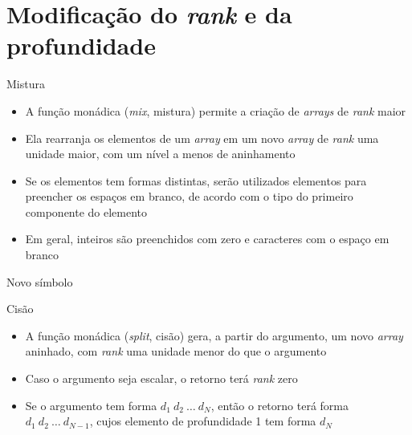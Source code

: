 \section{Modificação do {\it rank} e da profundidade}

\begin{frame}[fragile]{Mistura}

    \begin{itemize}
        \item A função monádica  (\textit{mix}, mistura) permite a criação de 
            \textit{arrays} de \textit{rank} maior
        \pause

        \item Ela rearranja os elementos de um \textit{array} em um novo \textit{array} de 
            \textit{rank} uma unidade maior, com um nível a menos de aninhamento
        \pause

        \item Se os elementos tem formas distintas, serão utilizados elementos para preencher os
            espaços em branco, de acordo com o tipo do primeiro componente do elemento
        \pause

        \item Em geral, inteiros são preenchidos com zero e caracteres com o espaço em branco
    \end{itemize}

\end{frame}

\begin{frame}[fragile]{Novo símbolo}


\end{frame}

\begin{frame}[fragile]{Cisão}

    \begin{itemize}
        \item A função monádica  (\textit{split}, cisão) gera, a partir do argumento,
            um novo \textit{array} aninhado, com \textit{rank} uma unidade menor do que o argumento 
        \pause

        \item Caso o argumento seja escalar, o retorno terá \textit{rank} zero
        \pause

        \item Se o argumento tem forma $d_1\ d_2\ \ldots\ d_N$, então o retorno terá forma
            $d_1\ d_2\ \ldots\ d_{N-1}$, cujos elemento de profundidade 1 tem forma $d_N$
    \end{itemize}

\end{frame}

